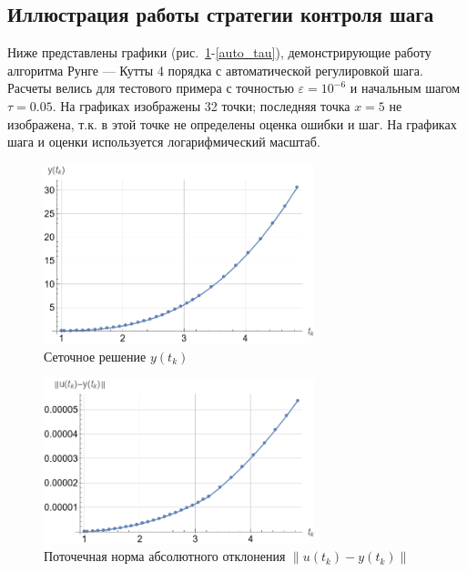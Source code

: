 \documentclass[12pt, a4paper]{article}
\begin{document}
	
	\subsection{Иллюстрация работы стратегии контроля шага}
	
	Ниже представлены графики (рис.~\ref{auto_yk}-\ref{auto_tau}), демонстрирующие работу алгоритма Рунге --- Кутты 4 порядка с автоматической регулировкой шага. Расчеты велись для тестового примера с точностью $\varepsilon = 10^{-6}$ и начальным шагом $\tau = 0.05$. На графиках изображены 32 точки; последняя точка $x = 5$ не изображена, т.к. в этой точке не определены оценка ошибки и шаг. На графиках шага и оценки используется логарифмический масштаб.
	
	\begin{figure}[!h]
		\centering
		\includegraphics[width=0.7\textwidth]{auto_yk}
		\caption{Сеточное решение $y(t_k)$}
		\label{auto_yk}
	\end{figure}
	
	\begin{figure}[!h]
		\centering
		\includegraphics[width=0.7\textwidth]{auto_norm}
		\caption{Поточечная норма абсолютного отклонения $\|u(t_k) - y(t_k)\|$}
		\label{auto_norm}
	\end{figure}
	
\end{document}
